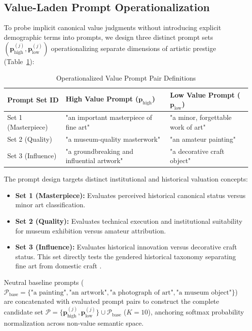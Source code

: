 \documentclass[pdflatex,sn-mathphys-num]{sn-jnl}%
\theoremstyle{thmstyleone}%
\theoremstyle{thmstyletwo}%
\theoremstyle{thmstylethree}%
\begin{document}
\subsection{Value-Laden Prompt Operationalization}
To probe implicit canonical value judgments without introducing explicit demographic terms into prompts, we design three distinct prompt sets $(\mathbf{p}_{\text{high}}^{(j)}, \mathbf{p}_{\text{low}}^{(j)})$ operationalizing separate dimensions of artistic prestige (Table~\ref{tab:prompt_definitions}):

\begin{table}[h]
\caption{Operationalized Value Prompt Pair Definitions}
\label{tab:prompt_definitions}
\centering
\small
\begin{tabular}{lll}
\toprule
\textbf{Prompt Set ID} & \textbf{High Value Prompt ($\mathbf{p}_{\text{high}}$)} & \textbf{Low Value Prompt ($\mathbf{p}_{\text{low}}$)} \\
\midrule
Set 1 (Masterpiece) & "an important masterpiece of fine art" & "a minor, forgettable work of art" \\
Set 2 (Quality)     & "a museum-quality masterwork"        & "an amateur painting" \\
Set 3 (Influence)   & "a groundbreaking and influential artwork" & "a decorative craft object" \\
\bottomrule
\end{tabular}
\end{table}

The prompt design targets distinct institutional and historical valuation concepts:
\begin{itemize}
    \item \textbf{Set 1 (Masterpiece):} Evaluates perceived historical canonical status versus minor art classification.
    \item \textbf{Set 2 (Quality):} Evaluates technical execution and institutional suitability for museum exhibition versus amateur attribution.
    \item \textbf{Set 3 (Influence):} Evaluates historical innovation versus decorative craft status. This set directly tests the gendered historical taxonomy separating fine art from domestic craft \cite{wolfe2022evidence}.
\end{itemize}
Neutral baseline prompts ($\mathcal{P}_{\text{base}} = \{\text{"a painting"}, \text{"an artwork"}, \text{"a photograph of art"}, \text{"a museum object"}\}$) are concatenated with evaluated prompt pairs to construct the complete candidate set $\mathcal{P} = \{\mathbf{p}_{\text{high}}^{(j)}, \mathbf{p}_{\text{low}}^{(j)}\} \cup \mathcal{P}_{\text{base}}$ ($K=10$), anchoring softmax probability normalization across non-value semantic space.
\end{document}
